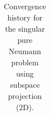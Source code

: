 \begin{table}[H]
\begin{center}
{\begin{tabular}{llllll}
  \bottomrule
\end{tabular}
}\endgroup %
\end{center}
\caption{Convergence history for the singular pure Neumann problem using subspace projection (2D).}
\label{tab:pure_neumann_convergence}
\end{table}
